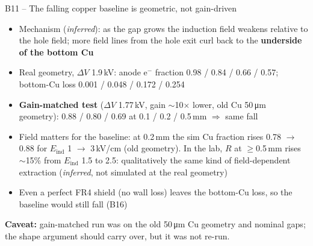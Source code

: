 \documentclass[aspectratio=169,11pt]{beamer}
\newcommand{\backlink}[1]{\hfill\hyperlink{#1}{\beamerreturnbutton{back}}}
\newcommand{\caveat}[1]{{\small\color{warn}\textbf{Caveat:} #1}}
\newcommand{\Eind}{E_\text{ind}}
\begin{document}
\begin{frame}[label=b-gainmatched]{B11 -- The falling copper baseline is geometric, not gain-driven}
  \small
  \begin{itemize}
    \item Mechanism (\emph{inferred}): as the gap grows the induction field weakens relative to the hole field; more field lines from the hole exit curl back to the \textbf{underside of the bottom Cu}
    \item Real geometry, $\Delta V$ 1.9\,kV: anode e$^-$ fraction 0.98 / 0.84 / 0.66 / 0.57; bottom-Cu loss 0.001 / 0.048 / 0.172 / 0.254
    \item \textbf{Gain-matched test} ($\Delta V$ 1.77\,kV, gain $\sim$10$\times$ lower, old Cu 50\,\si{\micro m} geometry): 0.88 / 0.80 / 0.69 at 0.1 / 0.2 / 0.5\,mm $\Rightarrow$ same fall
    \item Field matters for the baseline: at 0.2\,mm the sim Cu fraction rises 0.78 $\to$ 0.88 for $\Eind$ 1 $\to$ 3\,kV/cm (old geometry). In the lab, $R$ at $\ge$0.5\,mm rises $\sim$15\% from $\Eind$ 1.5 to 2.5: qualitatively the same kind of field-dependent extraction (\emph{inferred}, not simulated at the real geometry)
    \item Even a perfect FR4 shield (no wall loss) leaves the bottom-Cu loss, so the baseline would still fall (B16)
  \end{itemize}
  \caveat{gain-matched run was on the old 50\,\si{\micro m} Cu geometry and nominal gaps; the shape argument should carry over, but it was not re-run.}
  \backlink{m-cu}
\end{frame}
\end{document}
